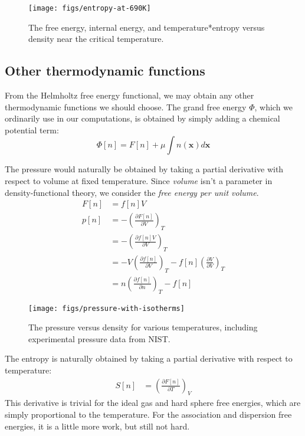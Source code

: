 \documentclass[letterpaper,twocolumn,amsmath,amssymb,prb]{revtex4-1}
\newcommand{\xx}{\textbf{x}}
\begin{document}
\begin{figure}
\begin{center}
\texttt{[image: figs/entropy-at-690K]}
\end{center}
\caption{The free energy, internal energy, and temperature*entropy versus density near the critical temperature.  }
\label{fig:energy-near-critical-temp}
\end{figure}

\subsection{Other thermodynamic functions}

From the Helmholtz free energy functional, we may obtain any other
thermodynamic functions we should choose.  The grand free energy
$\Phi$, which we ordinarily use in our computations, is obtained by
simply adding a chemical potential term:
\begin{equation}
  \Phi[n] = F[n] + \mu \int n(\xx) d\xx
\end{equation}

The pressure would naturally be obtained by taking a partial
derivative with respect to volume at fixed temperature.  Since
\emph{volume} isn't a parameter in density-functional theory, we
consider the \emph{free energy per unit volume}.
\begin{align}
  F[n] &= f[n]V \\
  p[n] &= -\left(\frac{\partial F[n]}{\partial V}\right)_{T} \\
  &= -\left(\frac{\partial f[n]V}{\partial V}\right)_{T} \\
  &= -V\left(\frac{\partial f[n]}{\partial V}\right)_{T}
   - f[n]\left(\frac{\partial V}{\partial V}\right)_{T} \\
  &= n \left(\frac{\partial f[n]}{\partial n}\right)_{T} - f[n]
\end{align}

\begin{figure}
\begin{center}
\texttt{[image: figs/pressure-with-isotherms]}
\end{center}
\caption{The pressure versus density for various temperatures, including experimental pressure data from NIST.  }
\label{fig:pressure-with-isotherms}
\end{figure}

The entropy is naturally obtained by taking a partial derivative with
respect to temperature:
\begin{align}
  S[n] &= \left(\frac{\partial F[n]}{\partial T}\right)_{V}
\end{align}
This derivative is trivial for the ideal gas and hard sphere free
energies, which are simply proportional to the temperature.  For the
association and dispersion free energies, it is a little more work,
but still not hard.
\end{document}
